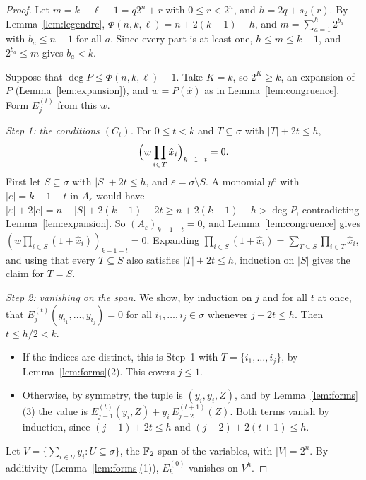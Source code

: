 \begin{proof}
Let \(m=k-\ell-1=q2^n+r\) with \(0\le r<2^n\), and \(h=2q+s_2(r)\). By
Lemma~\ref{lem:legendre}, \(\Phi(n,k,\ell)=n+2(k-1)-h\), and
\(m=\sum_{a=1}^h2^{b_a}\) with \(b_a\le n-1\) for all \(a\). Since every part is at
least one, \(h\le m\le k-1\), and \(2^{b_a}\le m\) gives \(b_a<k\).

Suppose that \(\deg P\le\Phi(n,k,\ell)-1\). Take \(K=k\), so \(2^K\ge k\), an
expansion of \(P\) (Lemma~\ref{lem:expansion}), and \(w=P(\hat x)\) as in
Lemma~\ref{lem:congruence}. Form \(E^{(t)}_j\) from this \(w\).

\emph{Step 1: the conditions \((C_t)\).} For \(0\le t<k\) and \(T\subseteq\sigma\)
with \(|T|+2t\le h\),
\[
 \Bigl(w\prod_{i\in T}\hat x_i\Bigr)_{k-1-t}=0 .
\]
First let \(S\subseteq\sigma\) with \(|S|+2t\le h\), and \(\varepsilon=\sigma\setminus S\).
A monomial \(y^e\) with \(|e|=k-1-t\) in \(A_\varepsilon\) would have
\(|\varepsilon|+2|e|=n-|S|+2(k-1)-2t\ge n+2(k-1)-h>\deg P\), contradicting
Lemma~\ref{lem:expansion}. So \((A_\varepsilon)_{k-1-t}=0\), and
Lemma~\ref{lem:congruence} gives
\((w\prod_{i\in S}(1+\hat x_i))_{k-1-t}=0\). Expanding
\(\prod_{i\in S}(1+\hat x_i)=\sum_{T\subseteq S}\prod_{i\in T}\hat x_i\), and using that
every \(T\subseteq S\) also satisfies \(|T|+2t\le h\), induction on \(|S|\) gives the
claim for \(T=S\).

\emph{Step 2: vanishing on the span.} We show, by induction on \(j\) and for all
\(t\) at once, that \(E^{(t)}_j(y_{i_1},\ldots,y_{i_j})=0\) for all
\(i_1,\ldots,i_j\in\sigma\) whenever \(j+2t\le h\). Then \(t\le h/2<k\).
\begin{itemize}
 \item If the indices are distinct, this is Step~1 with \(T=\{i_1,\ldots,i_j\}\), by
 Lemma~\ref{lem:forms}(2). This covers \(j\le1\).
 \item Otherwise, by symmetry, the tuple is \((y_i,y_i,Z)\), and by
 Lemma~\ref{lem:forms}(3) the value is
 \(E^{(t)}_{j-1}(y_i,Z)+y_i\,E^{(t+1)}_{j-2}(Z)\). Both terms vanish by induction,
 since \((j-1)+2t\le h\) and \((j-2)+2(t+1)\le h\).
\end{itemize}
Let \(V=\{\sum_{i\in U}y_i:U\subseteq\sigma\}\), the \(\mathbb F_2\)-span of the variables, with
\(|V|=2^n\). By additivity (Lemma~\ref{lem:forms}(1)), \(E^{(0)}_h\) vanishes on
\(V^h\).


\end{proof}
